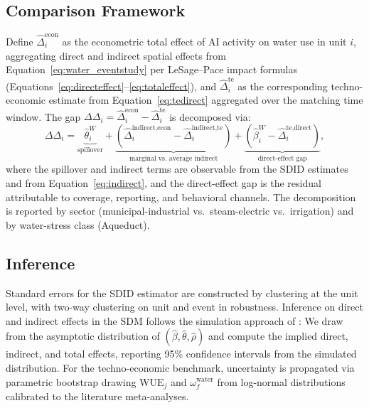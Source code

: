 \documentclass[11pt, letterpaper]{article}
\begin{document}
\subsection{Comparison Framework}
\label{sec:comparison}

Define $\widehat{\Delta}^{\text{econ}}_i$ as the econometric total effect of AI activity on water use in unit $i$, aggregating direct and indirect spatial effects from Equation~\eqref{eq:water_eventstudy} per LeSage--Pace impact formulas (Equations~\ref{eq:directeffect}--\ref{eq:totaleffect}), and $\widehat{\Delta}^{\text{te}}_i$ as the corresponding techno-economic estimate from Equation~\eqref{eq:tedirect} aggregated over the matching time window. The gap $\Delta\Delta_i = \widehat{\Delta}^{\text{econ}}_i - \widehat{\Delta}^{\text{te}}_i$ is decomposed via:
\begin{equation}
\Delta\Delta_i = \underbrace{\widehat{\theta}_i^{W}}_{\text{spillover}} + \underbrace{(\widehat{\Delta}^{\text{indirect,econ}}_i - \widehat{\Delta}^{\text{indirect,te}}_i)}_{\text{marginal vs.\ average indirect}} + \underbrace{(\widehat{\beta}_i^{W} - \widehat{\Delta}^{\text{te,direct}}_i)}_{\text{direct-effect gap}},
\label{eq:decomposition}
\end{equation}
where the spillover and indirect terms are observable from the SDID estimates and from Equation~\eqref{eq:indirect}, and the direct-effect gap is the residual attributable to coverage, reporting, and behavioral channels. The decomposition is reported by sector (municipal-industrial vs.\ steam-electric vs.\ irrigation) and by water-stress class (Aqueduct).

\subsection{Inference}
\label{sec:inference}

Standard errors for the SDID estimator are constructed by clustering at the unit level, with two-way clustering on unit and event in robustness. Inference on direct and indirect effects in the SDM follows the simulation approach of \citet{lesage2014interpretation}: We draw from the asymptotic distribution of $(\widehat{\beta}, \widehat{\theta}, \widehat{\rho})$ and compute the implied direct, indirect, and total effects, reporting 95\% confidence intervals from the simulated distribution. For the techno-economic benchmark, uncertainty is propagated via parametric bootstrap drawing $\text{WUE}_j$ and $\omega_f^{\text{water}}$ from log-normal distributions calibrated to the literature meta-analyses.
\end{document}
